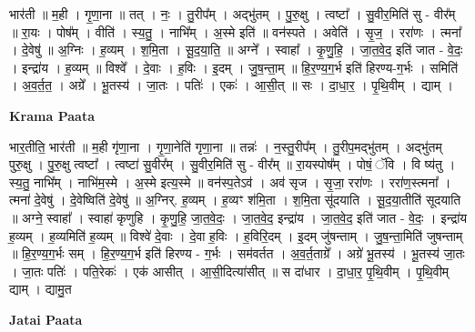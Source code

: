 \documentclass[17pt]{extarticle}
\begin{document}
भार॑ती ॥ म॒ही । गृ॒णा॒ना ॥ तत् । नः॒ । तु॒रीप᳚म् । अद्भु॑तम् । पु॒रु॒क्षु । त्वष्टा᳚ । सु॒वीर॒मिति॑ सु - वीर᳚म् ॥ रा॒यः । पोष᳚म् । वीति॑ । स्य॒तु॒ । नाभि᳚म् । अ॒स्मे इति॑ ॥ वन॑स्पते । अवेति॑ । सृ॒ज॒ । ररा॑णः । त्मना᳚ । दे॒वेषु॑ ॥ अ॒ग्निः । ह॒व्यम् । श॒मि॒ता । सू॒द॒या॒ति॒ ॥ अग्ने᳚ । स्वाहा᳚ । कृ॒णु॒हि॒ । जा॒त॒वे॒द॒ इति॑ जात - वे॒दः॒ । इन्द्रा॑य । ह॒व्यम् ॥ विश्वे᳚ । दे॒वाः । ह॒विः । इ॒दम् । जु॒ष॒न्ता॒म् ॥ हि॒र॒ण्य॒ग॒र्भ इति॑ हिरण्य-ग॒र्भः । समिति॑ । अ॒व॒र्त॒त॒ । अग्रे᳚ । भू॒तस्य॑ । जा॒तः । पतिः॑ । एकः॑ । आ॒सी॒त् ॥ सः । दा॒धा॒र॒ । पृ॒थि॒वीम् । द्याम् ।  \newline


\textbf{Krama Paata} \newline

भार॒तीति॒ भार॑ती ॥ म॒ही गृ॑णा॒ना । गृ॒णा॒नेति॑ गृणा॒ना ॥ तन्नः॑ । न॒स्तु॒रीप᳚म् । तु॒रीप॒मद्भु॑तम् । अद्भु॑तम् पुरु॒क्षु । पु॒रु॒क्षु त्वष्टा᳚ । त्वष्टा॑ सु॒वीर᳚म् । सु॒वीर॒मिति॑ सु - वीर᳚म् ॥ रा॒यस्पोष᳚म् । पोषं॒ ॅवि । वि ष्य॑तु । स्य॒तु॒ नाभि᳚म् । नाभि॑म॒स्मे । अ॒स्मे इत्य॒स्मे ॥ वन॑स्प॒तेऽव॑ । अव॑ सृज । सृ॒जा॒ ररा॑णः । ररा॑ण॒स्त्मना᳚ । त्मना॑ दे॒वेषु॑ । दे॒वेष्विति॑ दे॒वेषु॑ ॥ अ॒ग्निर्. ह॒व्यम् । ह॒व्यꣳ श॑मि॒ता । श॒मि॒ता सू॑दयाति । सू॒द॒या॒तीति॑ सूदयाति ॥ अग्ने॒ स्वाहा᳚ । स्वाहा॑ कृणुहि । कृ॒णु॒हि॒ जा॒त॒वे॒दः॒ । जा॒त॒वे॒द॒ इन्द्रा॑य । जा॒त॒वे॒द॒ इति॑ जात - वे॒दः॒ । इन्द्रा॑य ह॒व्यम् । ह॒व्यमिति॑ ह॒व्यम् ॥ विश्वे॑ दे॒वाः । दे॒वा ह॒विः । ह॒विरि॒दम् । इ॒दम् जु॑षन्ताम् । जु॒ष॒न्ता॒मिति॑ जुषन्ताम् ॥ हि॒र॒ण्य॒ग॒र्भः सम् । हि॒र॒ण्य॒ग॒र्भ इति॑ हिरण्य - ग॒र्भः । सम॑वर्तत । अ॒व॒र्त॒ताग्रे᳚ । अग्रे॑ भू॒तस्य॑ । भू॒तस्य॑ जा॒तः । जा॒तः पतिः॑ । पति॒रेकः॑ । एक॑ आसीत् । आ॒सी॒दित्या॑सीत् ॥ स दा॑धार । दा॒धा॒र॒ पृ॒थि॒वीम् । पृ॒थि॒वीम् द्याम् । द्यामु॒त \newline

\textbf{Jatai Paata} \newline
\end{document}
